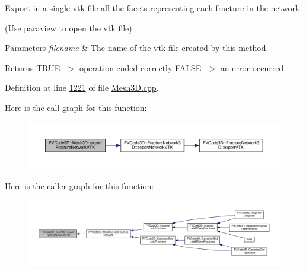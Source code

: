 Export in a single vtk file all the facets representing each fracture in the network. 

(Use paraview to open the vtk file) 
\begin{DoxyParams}{Parameters}
{\em filename} & The name of the vtk file created by this method \\
\hline
\end{DoxyParams}
\begin{DoxyReturn}{Returns}
T\+R\+UE -\/$>$ operation ended correctly F\+A\+L\+SE -\/$>$ an error occurred 
\end{DoxyReturn}


Definition at line \hyperlink{Mesh3D_8cpp_source_l01221}{1221} of file \hyperlink{Mesh3D_8cpp_source}{Mesh3\+D.\+cpp}.



Here is the call graph for this function\+:
\nopagebreak
\begin{figure}[H]
\begin{center}
\leavevmode
\includegraphics[width=350pt]{classFVCode3D_1_1Mesh3D_a98c0a7dd95e33c21e813f9402d71da15_cgraph}
\end{center}
\end{figure}




Here is the caller graph for this function\+:
\nopagebreak
\begin{figure}[H]
\begin{center}
\leavevmode
\includegraphics[width=350pt]{classFVCode3D_1_1Mesh3D_a98c0a7dd95e33c21e813f9402d71da15_icgraph}
\end{center}
\end{figure}


